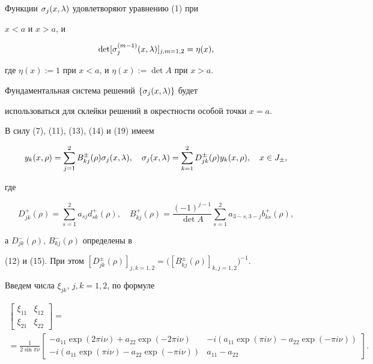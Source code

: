Функции $\sigma_j(x,\lambda)$ удовлетворяют уравнению (1) при


$x<a$ и $x>a$, и


\begin{equation}


\det[\sigma_j^{(m-1)}(x,\la)]_{j,m=1,2}=\eta(x),


\end{equation}


где $\eta(x):=1$ при $x<a$, и $\eta(x):=\det A$ при $x>a$.


Фундаментальная система решений $\{\sigma_j(x,\lambda)\}$ будет


использоваться для склейки решений в окрестности особой точки $x=a$.


В силу (7), (11), (13), (14) и (19) имеем


\begin{equation}


y_k(x,\rho)=\sum_{j=1}^{2} B_{kj}^{\pm}(\rho)\sigma_j(x,\la),\quad


\sigma_j(x,\la)=\sum_{k=1}^{2}D_{jk}^{\pm}(\rho)y_k(x,\rho),


\quad x\in J_{\pm},


\end{equation}


где


\begin{equation}


D_{jk}^{+}(\rho)=\sum_{s=1}^{2} a_{sj}d_{sk}^{+}(\rho),\quad


B_{kj}^{+}(\rho)=\frac{(-1)^{j-1}}{\det A}


\sum_{s=1}^{2} a_{3-s,3-j}b_{ks}^{+}(\rho),


\end{equation}


а $D_{jk}^{-}(\rho)$, $B_{kj}^{-}(\rho)$ определены в


(12) и (15). При этом $[D_{jk}^{\pm}(\rho)]_{j,k=1,2}=


\big([B_{kj}^{\pm}(\rho)]_{k,j=1,2}\big)^{-1}$.


Введем числа $\xi_{jk}$, $j,k=1,2$, по формуле


\begin{multline}


\begin{bmatrix}


\xi_{11} & \xi_{12} \\ \xi_{21} & \xi_{22}


\end{bmatrix}


= \\


%


= \frac{1}{2\sin\pi\nu}


\begin{bmatrix} -a_{11}\exp(2\pi i\nu)+a_{22}\exp(-2\pi i\nu) &


-i(a_{11}\exp(\pi i\nu)-a_{22}\exp(-\pi i\nu)) \\


-i(a_{11}\exp(\pi i\nu)-a_{22}\exp(-\pi i\nu)) & a_{11}-a_{22}


\end{bmatrix}.


\end{multline}


